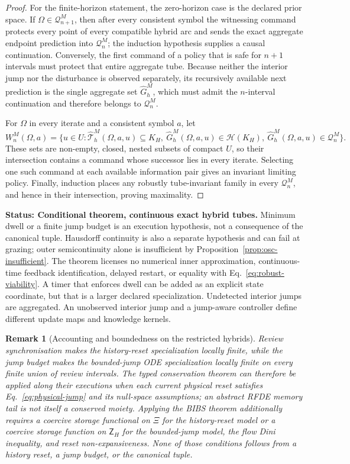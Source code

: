 \documentclass[11pt]{article}
\newtheorem{remark}{Remark}
\theoremstyle{definition}
\newcommand{\status}[1]{\par\smallskip\noindent\textbf{Status: #1.}\quad}
\begin{document}
\begin{proof}
For the finite-horizon statement, the zero-horizon case is the declared
prior space.  If $\Omega\in\mathcal Q_{n+1}^M$, then after every consistent
symbol the witnessing command protects every point of every compatible
hybrid arc and sends the exact aggregate endpoint prediction into
$\mathcal Q_n^M$; the induction hypothesis supplies a causal continuation.
Conversely, the first command of a policy that is safe for $n+1$ intervals
must protect that entire aggregate tube.  Because neither the interior jump
nor the disturbance is observed separately, its recursively available next
prediction is the single aggregate set $\widehat G_h^M$, which must admit the
$n$-interval continuation and therefore belongs to $\mathcal Q_n^M$.

For $\Omega$ in every iterate and a consistent symbol $a$, let
\[
W_n^M(\Omega,a)=\{u\in U:
\widehat{\mathscr T}_h^M(\Omega,a,u)\subseteq K_H,\
\widehat G_h^M(\Omega,a,u)\in\mathcal H(K_H),\
\widehat G_h^M(\Omega,a,u)\in\mathcal Q_n^M\}.
\]
These sets are non-empty, closed, nested subsets of compact $U$, so their
intersection contains a command whose successor lies in every iterate.
Selecting one such command at each available information pair gives an
invariant limiting policy.  Finally, induction places any robustly
tube-invariant family in every $\mathcal Q_n^M$, and hence in their
intersection, proving maximality.
\end{proof}

\status{Conditional theorem, continuous exact hybrid tubes} Minimum dwell or
a finite jump budget is an execution hypothesis, not a consequence of the
canonical tuple.  Hausdorff continuity is also a separate hypothesis and
can fail at grazing; outer semicontinuity alone is insufficient by
Proposition~\ref{prop:osc-insufficient}.  The theorem licenses no numerical
inner approximation, continuous-time feedback identification, delayed
restart, or equality with Eq.~\eqref{eq:robust-viability}.  A timer that
enforces dwell can be added as an explicit state coordinate, but that is a
larger declared specialization.  Undetected interior jumps are aggregated.
An unobserved interior jump and a jump-aware controller define different
update maps and knowledge kernels.

\begin{remark}[Accounting and boundedness on the restricted hybrids]
Review synchronisation makes the history-reset specialization locally
finite, while the jump budget makes the bounded-jump ODE specialization
locally finite on every finite union of review intervals.  The typed
conservation theorem can therefore be applied along their executions when
each current physical reset satisfies Eq.~\eqref{eq:physical-jump} and its
null-space assumptions; an abstract RFDE memory tail is not itself a
conserved moiety.  Applying the BIBS theorem additionally requires a
coercive storage functional on $\Xi$ for the history-reset model or a
coercive storage function on $\mathsf Z_H$ for the bounded-jump model, the
flow Dini inequality, and reset non-expansiveness.  None of those conditions follows from a history reset,
a jump budget, or the canonical tuple.
\end{remark}
\end{document}
